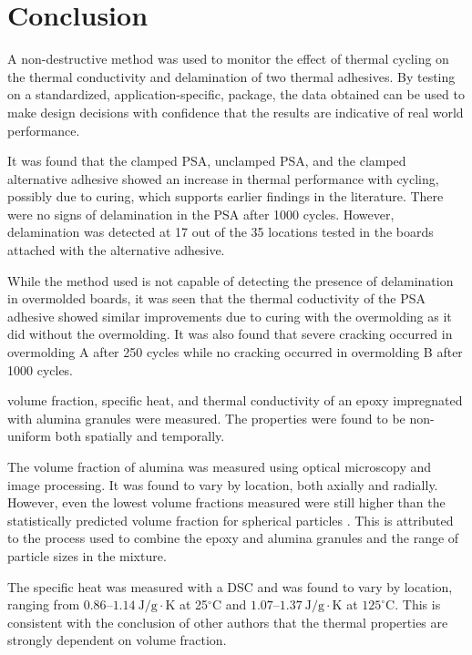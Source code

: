\chapter{Conclusion}

A non-destructive method was used to monitor the effect of thermal cycling on the thermal conductivity and delamination of two thermal adhesives.  By testing on a standardized, application-specific, package, the data obtained can be used to make design decisions with confidence that the results are indicative of real world performance.

It was found that the clamped PSA, unclamped PSA, and the clamped alternative adhesive showed an increase in thermal performance with cycling, possibly due to curing, which supports earlier findings in the literature.  There were no signs of delamination in the PSA after 1000 cycles.  However, delamination was detected at 17 out of the 35 locations tested in the boards attached with the alternative adhesive.  

While the method used is not capable of detecting the presence of delamination in overmolded boards, it was seen that the thermal coductivity of the PSA adhesive showed similar improvements due to curing with the overmolding as it did without the overmolding.  It was also found that severe cracking occurred in overmolding A after 250 cycles while no cracking occurred in overmolding B after 1000 cycles.

volume fraction, specific heat, and thermal conductivity of an epoxy impregnated with alumina granules were measured.  The properties were found to be non-uniform both spatially and temporally. 

The volume fraction of alumina was measured using optical microscopy and image processing.  It was found to vary by location, both axially and radially.  However, even the lowest volume fractions measured were still higher than the statistically predicted volume fraction for spherical particles \cite{McGeary1961}.  This is attributed to the process used to combine the epoxy and alumina granules and the range of particle sizes in the mixture.

The specific heat was measured with a DSC and was found to vary by location, ranging from \(0.86\textrm{--}1.14\:\mathrm{J/g\cdot K}\) at 25\(^{\circ}\mathrm{C}\) and \(1.07\textrm{--}1.37\:\mathrm{J/g\cdot K}\) at \(125^{\circ}\mathrm{C}\).  This is consistent with the conclusion of other authors \cite{McGrath2008, Wong1999, Mamunya2002, Singh2003} that the thermal properties are strongly dependent on volume fraction.  


